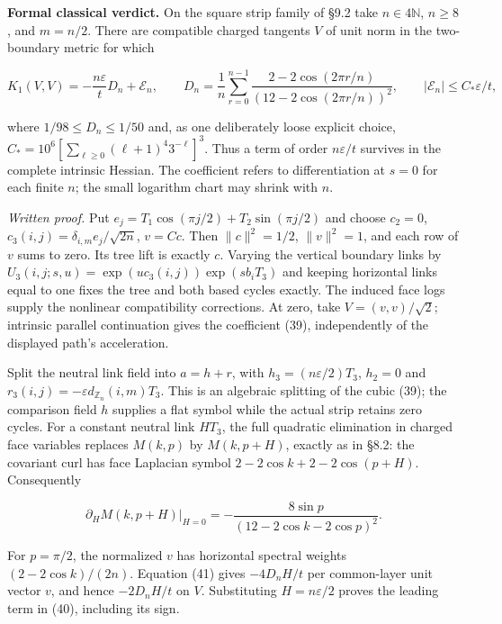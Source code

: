 \documentclass[11pt,a4paper]{article}
\begin{document}
\textbf{Formal classical verdict.} On the square strip family of §9.2
take \(n\in4\mathbb N\), \(n\ge8\), and \(m=n/2\). There are compatible
charged tangents \(V\) of unit norm in the two-boundary metric for which

\[K_1(V,V)=-\frac{n\varepsilon}{t}D_n+\mathcal E_n,\qquad
D_n=\frac1n\sum_{r=0}^{n-1}
\frac{2-2\cos(2\pi r/n)}{(12-2\cos(2\pi r/n))^2},\qquad
|\mathcal E_n|\le C_*\varepsilon/t,\tag{40}\]

where \(1/98\le D_n\le1/50\) and, as one deliberately loose explicit
choice, \(C_*=10^6[\sum_{\ell\ge0}(\ell+1)^4 3^{-\ell}]^3\). Thus a term
of order \(n\varepsilon/t\) survives in the complete intrinsic Hessian.
The coefficient refers to differentiation at \(s=0\) for each finite
\(n\); the small logarithm chart may shrink with \(n\).

\emph{Written proof.} Put \(e_j=T_1\cos(\pi j/2)+T_2\sin(\pi j/2)\) and
choose \(c_2=0\), \(c_3(i,j)=\delta_{i,m}e_j/\sqrt{2n}\), \(v=Cc\). Then
\(\|c\|^2=1/2\), \(\|v\|^2=1\), and each row of \(v\) sums to zero. Its
tree lift is exactly \(c\). Varying the vertical boundary links by
\(U_3(i,j;s,u)=\exp(uc_3(i,j))\exp(sb_iT_3)\) and keeping horizontal
links equal to one fixes the tree and both based cycles exactly. The
induced face logs supply the nonlinear compatibility corrections. At
zero, take \(V=(v,v)/\sqrt2\); intrinsic parallel continuation gives the
coefficient (39), independently of the displayed path's acceleration.

Split the neutral link field into \(a=h+r\), with
\(h_3=(n\varepsilon/2)T_3\), \(h_2=0\) and
\(r_3(i,j)=-\varepsilon d_{\mathbb Z_n}(i,m)T_3\). This is an algebraic
splitting of the cubic (39); the comparison field \(h\) supplies a flat
symbol while the actual strip retains zero cycles. For a constant
neutral link \(HT_3\), the full quadratic elimination in charged face
variables replaces \(M(k,p)\) by \(M(k,p+H)\), exactly as in §8.2: the
covariant curl has face Laplacian symbol \(2-2\cos k+2-2\cos(p+H)\).
Consequently

\[\partial_H M(k,p+H)|_{H=0}
=-\frac{8\sin p}{(12-2\cos k-2\cos p)^2}.\tag{41}\]

For \(p=\pi/2\), the normalized \(v\) has horizontal spectral weights
\((2-2\cos k)/(2n)\). Equation (41) gives \(-4D_nH/t\) per common-layer
unit vector \(v\), and hence \(-2D_nH/t\) on \(V\). Substituting
\(H=n\varepsilon/2\) proves the leading term in (40), including its
sign.
\end{document}
